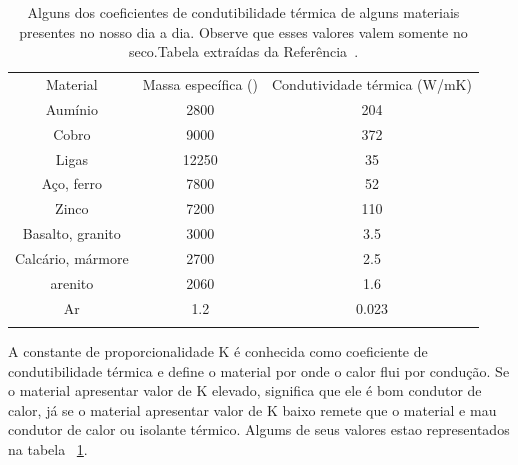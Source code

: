 \documentclass[a4wide]{report}
\begin{document}
\begin{table}[!h]
\centering
 \begin{tabular}{ccc}
  \hline\\[-0.37cm]
  \hline
  Material                 & Massa específica ()          & Condutividade térmica (W/mK)  \\ \hline
  Aumínio              &	2800                                         &  204                    \\
  Cobro                  &	9000                                         & 372                     \\
 Ligas                &        12250                                       & 35                  \\
 Aço, ferro          &	         7800                                & 52              \\
 Zinco                 &	 7200                                        &  110   \\
 Basalto, granito     &	          3000                                         &  3.5 \\
 Calcário, mármore      &        2700                                      &   2.5   \\
  arenito               &	2060                                         &  1.6 \\
 Ar                     & 	1.2                                          & 0.023 \\
 \hline\\[-0.37cm]
  \hline
\end{tabular}
\caption{Alguns dos coeficientes de condutibilidade térmica de alguns materiais presentes no nosso dia a dia.
Observe que esses valores valem somente no seco.Tabela extraídas da Referência~\cite{protolab}.}
\label{Ks}
\end{table}

A constante de proporcionalidade K é conhecida como coeficiente de condutibilidade térmica e 
define o material por onde o calor flui por condução. Se o material apresentar valor de K elevado,
significa que ele é bom condutor de calor, já se o material apresentar valor de K baixo remete que 
o material e mau condutor de calor ou isolante térmico. Algums de seus valores estao representados 
na tabela ~\ref{Ks}.
\end{document}
